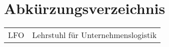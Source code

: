 \section*{Abkürzungsverzeichnis}
\label{sec:abbreviations}
\bigskip

\begin{tabular}{ll}
  LFO & Lehrstuhl für Unternehmenslogistik \\
\end{tabular}
